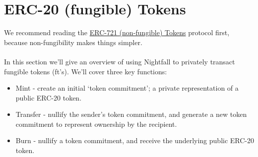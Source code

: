 \documentclass{article}
\begin{document}


\newpage


\newpage


\newpage


\newpage



\newpage
\section{ERC-20 (fungible) Tokens}
\label{sec:20}
\secttoc
\mtcskip
\sectlof

\noindent
We recommend reading the \hyperref[sec:721]{ERC-721 (non-fungible) Tokens} protocol first, because non-fungibility makes things simpler.\\
\\
In this section we'll give an overview of using Nightfall to privately transact fungible tokens (ft's). We'll cover three key functions:
\begin{itemize}
	\item Mint - create an initial `token commitment'; a private representation of a public ERC-20 token.
	\item Transfer - nullify the sender's token commitment, and generate a new token commitment to represent ownership by the recipient.
	\item Burn - nullify a token commitment, and receive the underlying public ERC-20 token.
\end{itemize}



\newpage


\newpage


\newpage


\newpage



\end{document}

